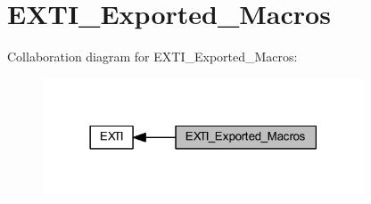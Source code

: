 \hypertarget{group___e_x_t_i___exported___macros}{}\section{E\+X\+T\+I\+\_\+\+Exported\+\_\+\+Macros}
\label{group___e_x_t_i___exported___macros}
Collaboration diagram for E\+X\+T\+I\+\_\+\+Exported\+\_\+\+Macros\+:
\nopagebreak
\begin{figure}[H]
\begin{center}
\leavevmode
\includegraphics[width=270pt]{group___e_x_t_i___exported___macros}
\end{center}
\end{figure}
